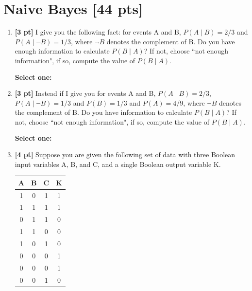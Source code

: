 \documentclass[12pt]{article}
\renewcommand{\circle}{\tikz\draw[black] (0,0) circle (1ex);}
\begin{document}
\section{Naive Bayes [44 pts]}
\begin{enumerate}
    \item \textbf{[3 pt]} I give you the following fact: for events A and B, $P(A\mid B) = 2/3$ and $P(A\mid \neg B) = 1/3$, where $\neg B$ denotes the complement of B. Do you have enough information to calculate $P(B\mid A)$? If not, choose ``not enough information", if so, compute the value of $P(B\mid A)$.

    \textbf{Select one:}
    
    
    \item \textbf{[3 pt]} Instead if I give you for events A and B, $P(A\mid B) = 2/3$, $P(A\mid \neg B) = 1/3$ and $P(B) = 1/3$ and $P(A) = 4/9$, where $\neg B$ denotes the complement of B. Do you have information to calculate $P(B\mid A)$? If not, choose ``not enough information", if so, compute the value of $P(B\mid A)$.

    \textbf{Select one:}
    
    
    \clearpage
    
    \item \textbf{[4 pt]} Suppose you are given the following set of data with three Boolean input variables A, B, and C, and a single Boolean output variable K.
    
    \begin{center}
    \begin{tabular}{|c|c|c|c|}
    \hline
    A & B & C & K   \\ \hline
    1 & 0 & 1 & 1   \\ \hline
    1 & 1 & 1 & 1  \\ \hline
    0 & 1 & 1 & 0   \\ \hline
    1 & 1 & 0 & 0   \\ \hline
    1 & 0 & 1 & 0   \\ \hline
    0 & 0 & 0 & 1   \\ \hline
    0 & 0 & 0 & 1   \\ \hline
    0 & 0 & 1 & 0   \\ \hline
    \end{tabular}
    \end{center}
    

\end{enumerate}
\end{document}
